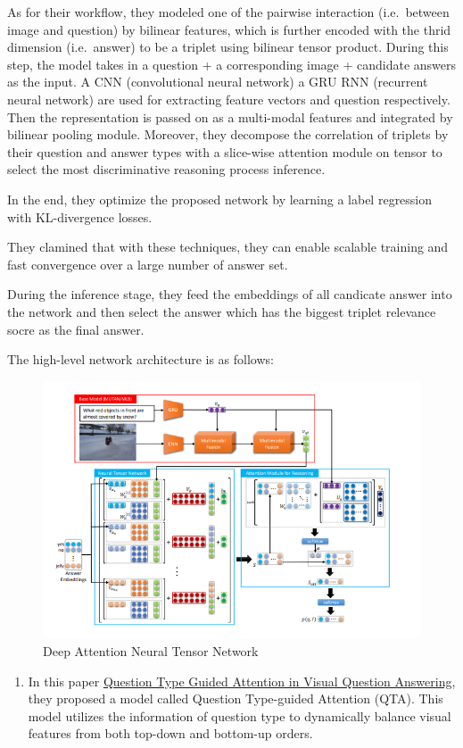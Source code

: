 \documentclass{acm_proc_article-sp}
\providecommand{\tightlist}{%
  \setlength{\itemsep}{0pt}\setlength{\parskip}{0pt}}
\begin{document}
As for their workflow, they modeled one of the pairwise interaction
(i.e.~between image and question) by bilinear features, which is further
encoded with the thrid dimension (i.e.~answer) to be a triplet using
bilinear tensor product. During this step, the model takes in a question
+ a corresponding image + candidate answers as the input. A CNN
(convolutional neural network) a GRU RNN (recurrent neural network) are
used for extracting feature vectors and question respectively. Then the
representation is passed on as a multi-modal features and integrated by
bilinear pooling module. Moreover, they decompose the correlation of
triplets by their question and answer types with a slice-wise attention
module on tensor to select the most discriminative reasoning process
inference.

In the end, they optimize the proposed network by learning a label
regression with KL-divergence losses.

They clamined that with these techniques, they can enable scalable
training and fast convergence over a large number of answer set.

During the inference stage, they feed the embeddings of all candicate
answer into the network and then select the answer which has the biggest
triplet relevance socre as the final answer.

The high-level network architecture is as follows:

\begin{figure}
\centering
\includegraphics{img/vqa.png}
\caption{Deep Attention Neural Tensor Network}
\end{figure}

\begin{enumerate}
\def\labelenumi{\arabic{enumi}.}
\setcounter{enumi}{1}
\tightlist
\item
  In this paper \href{https://arxiv.org/pdf/1804.02088.pdf}{Question
  Type Guided Attention in Visual Question Answering}, they proposed a
  model called Question Type-guided Attention (QTA). This model utilizes
  the information of question type to dynamically balance visual
  features from both top-down and bottom-up orders.
\end{enumerate}
\end{document}
